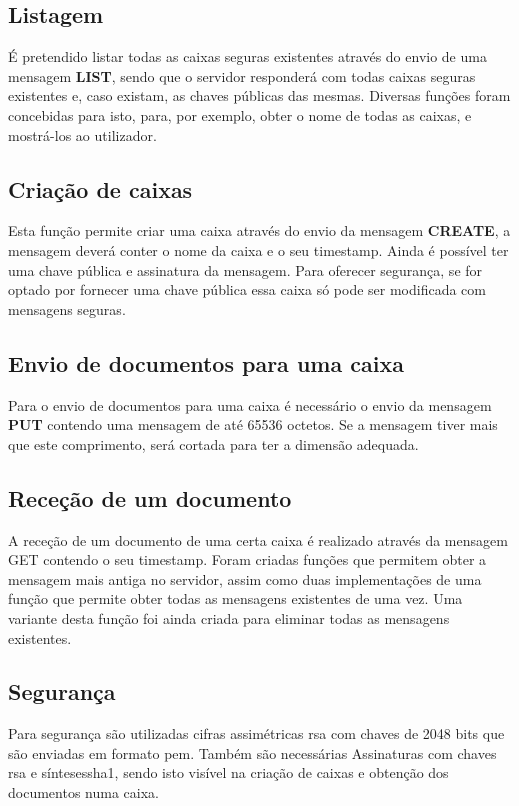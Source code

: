 \documentclass{report}
\begin{document}
\subsection{Listagem}
É pretendido listar todas as caixas seguras existentes através do envio de uma mensagem \textbf{LIST}, sendo que o servidor responderá com todas caixas seguras existentes e, caso existam, as chaves públicas das mesmas. Diversas funções foram concebidas para isto, para, por exemplo, obter o nome de todas as caixas, e mostrá-los ao utilizador.


\subsection{Criação de caixas}
Esta função permite criar uma caixa através do envio da mensagem \textbf{CREATE}, a mensagem deverá conter o nome da caixa e o seu timestamp. Ainda é possível ter uma chave pública e assinatura da mensagem. Para oferecer segurança, se for optado por fornecer uma chave pública essa caixa só pode ser modificada com mensagens seguras.


\subsection{Envio de documentos para uma caixa}
Para o envio de documentos para uma caixa é necessário o envio da mensagem \textbf{PUT} contendo uma mensagem de até 65536 octetos. Se a mensagem tiver mais que este comprimento, será cortada para ter a dimensão adequada.


\subsection{Receção de um documento}
A receção de um documento de uma certa caixa é realizado através da mensagem GET contendo o seu timestamp. Foram criadas funções que permitem obter a mensagem mais antiga no servidor, assim como duas implementações de uma função que permite obter todas as mensagens existentes de uma vez. Uma variante desta função foi ainda criada para eliminar todas as mensagens existentes.


\subsection{Segurança}
Para segurança são utilizadas cifras assimétricas \ac{rsa} com chaves de 2048 bits que são enviadas em formato \ac{pem}. Também são necessárias Assinaturas com chaves \ac{rsa} e sínteses{sha1}, sendo isto visível na criação de caixas e obtenção dos documentos numa caixa.
\end{document}
